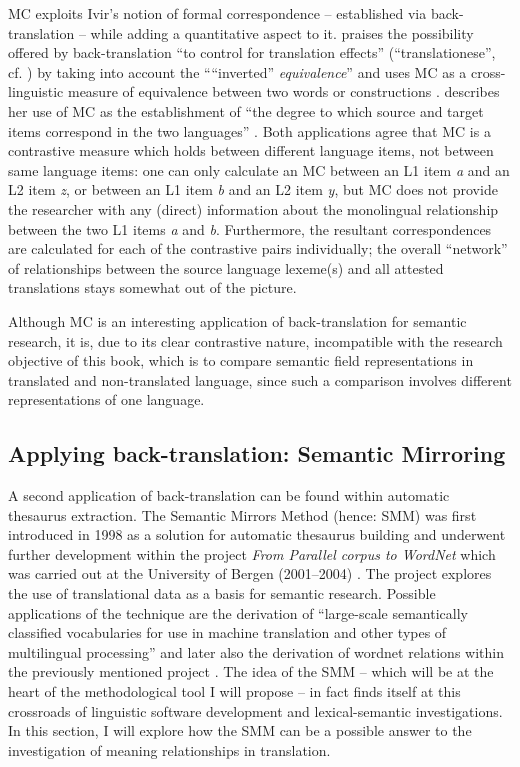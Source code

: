 MC exploits Ivir’s notion of formal correspondence – established via back-translation – while adding a quantitative aspect to it. \citet{de_los_angeles_gomez_gonzalez_causative_2008} praises the possibility offered by back-translation “to control for translation effects” (“translationese”, cf. \citealt{wollin_translationese_1986}) by taking into account the “``inverted'' \textit{equivalence}” \citep[186]{de_los_angeles_gomez_gonzalez_causative_2008} and uses MC as a cross-linguistic measure of equivalence between two words or constructions \citep{de_los_angeles_gomez_gonzalez_causative_2008}. \citet{mortier_semantic_2010} describes her use of MC as the establishment of “the degree to which source and target items correspond in the two languages” \citep[410]{mortier_semantic_2010}. Both applications agree that MC is a contrastive measure which holds between different language items, not between same language items: one can only calculate an MC between an L1 item \textit{a} and an L2 item \textit{z}, or between an L1 item \textit{b} and an L2 item \textit{y}, but MC does not provide the researcher with any (direct) information about the monolingual relationship between the two L1 items \textit{a} and \textit{b}. Furthermore, the resultant correspondences are calculated for each of the contrastive pairs individually; the overall ``network'' of relationships between the source language lexeme(s) and all attested translations stays somewhat out of the picture.

Although MC is an interesting application of back-translation for semantic research, it is, due to its clear contrastive nature, incompatible with the research objective of this book, which is to compare semantic field representations in translated and non-translated language, since such a comparison involves different representations of one language.

\subsection{Applying back-translation: Semantic Mirroring}
\label{sec:2.3.4} 
A second application of back-translation can be found within automatic thesaurus extraction. The Semantic Mirrors Method (hence: SMM) was first introduced in 1998 as a solution for automatic thesaurus building and underwent further development within the project \textit{From Parallel corpus to WordNet} which was carried out at the University of Bergen (2001--2004) \citep[311]{aijmer_translations_2004}. The project explores the use of translational data as a basis for semantic research. Possible applications of the technique are the derivation of “large-scale semantically classified vocabularies for use in machine translation and other types of multilingual processing” \citep[51]{johansson_translational_1998} and later also the derivation of wordnet relations within the previously mentioned project \citep[311]{aijmer_translations_2004}. The idea of the SMM – which will be at the heart of the methodological tool I will propose – in fact finds itself at this crossroads of linguistic software development and lexical-semantic investigations. In this section, I will explore how the SMM can be a possible answer to the investigation of meaning relationships in translation.

